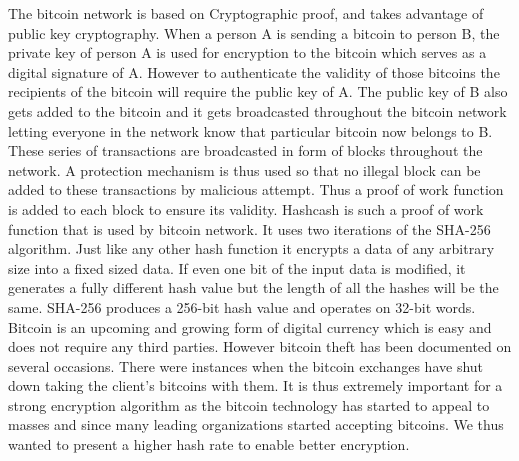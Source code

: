 \begin{Introduction and Motivation}
	\label{section:introduction}
The bitcoin network is based on Cryptographic proof, and takes advantage of public key cryptography. When a person A is sending a bitcoin to person B, the private key of person A is used for encryption to the bitcoin which serves as a digital signature of A. However to authenticate the validity of those bitcoins the recipients of the bitcoin will require the public key of A. The public key of B also gets added to the bitcoin and it gets broadcasted throughout the bitcoin network letting everyone in the network know that particular bitcoin now belongs to B. These series of transactions are broadcasted in form of blocks throughout the network. A protection mechanism is thus used so that no illegal block can be added to these transactions by malicious attempt. Thus a proof of work function is added to each block to ensure its validity. Hashcash is such a proof of work function that is used by bitcoin network. It uses two iterations of the SHA-256 algorithm. Just like any other hash function it encrypts a data of any arbitrary size into a fixed sized data. If even one bit of the input data is modified, it generates a fully different hash value but the length of all the hashes will be the same. SHA-256 produces a 256-bit hash value and operates on 32-bit words.
Bitcoin is an upcoming and growing form of digital currency which is easy and does not require any third parties. However bitcoin theft has been documented on several occasions. There were instances when the bitcoin exchanges have shut down taking the client’s bitcoins with them. It is thus extremely important for a strong encryption algorithm as the bitcoin technology has started to appeal to masses and since many leading organizations started accepting bitcoins. We thus wanted to present a higher hash rate to enable better encryption.
\end{Introduction and Motivation}
